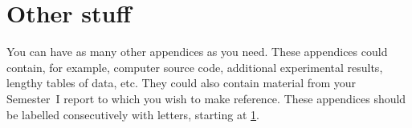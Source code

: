 \documentclass[a4paper,fleqn,usenatbib]{mnras}
\begin{document}
\section{Other stuff}
\label{other appendices}
You can have as many other appendices as you need. These appendices could contain, for example, computer source code, additional experimental results, lengthy tables of data, etc.  They could also contain material from your Semester~I report to which you wish to make reference. These appendices should be labelled consecutively with letters, starting at \ref{other appendices}.




\bsp	%
\label{lastpage}
\end{document}
